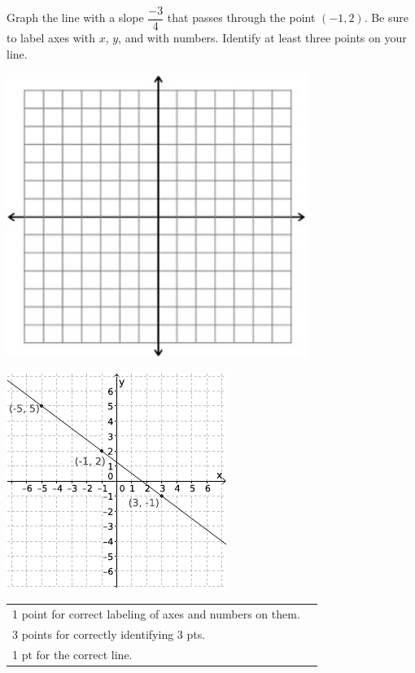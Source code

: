 {
	Graph the line with a slope $\dfrac{-3}{4}$ that passes through the point $(-1, 2)$. Be sure to label axes with $x$, $y$, and with numbers. Identify at least three points on your line.\begin{onlyproblem}\begin{center}\includegraphics{fig-graphpaper.png}\end{center}\end{onlyproblem} \begin{onlysolution}\begin{center}\includegraphics{fig095-08-c-answer}\end{center}\end{onlysolution}
}
{
	\begin{tabular}{l r}
	1 point for correct labeling of axes and numbers on them.\\
	3 points for correctly identifying 3 pts.\\
	1 pt for the correct line.\\
	\end{tabular}
}

